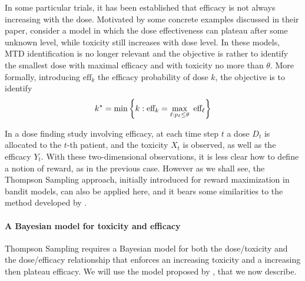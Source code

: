 In some particular trials, it has been established that efficacy is not always increasing with the dose. Motivated by some concrete examples discussed in their paper, \cite{MKR17} consider a model in which the dose effectiveness can plateau after some unknown level, while toxicity still increases with dose level. In these models, MTD identification is no longer relevant and the objective is rather to identify the smallest dose with maximal efficacy and with toxicity no more than $\theta$. More formally, introducing $\text{eff}_k$ the efficacy probability of dose $k$, the objective is to identify
\[k^* = \min\left\{ k : \eff_k = \max_{\ell : p_\ell \leq \theta} \ \text{eff}_\ell\right\}  \]

In a dose finding study involving efficacy, at each time step $t$ a dose $D_t$ is allocated to the $t$-th patient, and the toxicity $X_t$ is observed, as well as the efficacy $Y_t$. With these two-dimensional observations, it is less clear how to define a notion of reward, as in the previous case. However as we shall see, the Thompson Sampling approach, initially introduced for reward maximization in bandit models, can also be applied here, and it bears some similarities to the method developed by \cite{MKR17}.

\paragraph{A Bayesian model for toxicity and efficacy} Thompson Sampling requires a Bayesian model for both the dose/toxicity and the dose/efficacy relationship that enforces an increasing toxicity and a increasing then plateau efficacy. We will use the model proposed by \cite{MKR17}, that we now describe.

